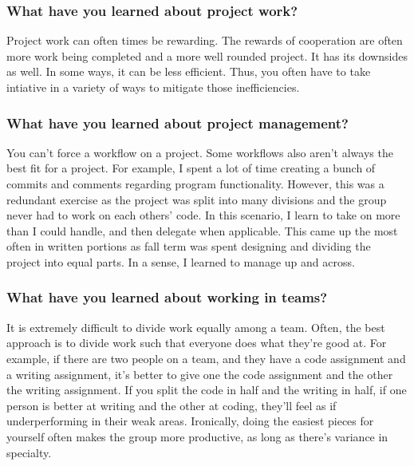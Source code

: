 \documentclass[10pt,journal,compsoc, draftclsnofoot,onecolumn]{IEEEtran}
\begin{document}
\subsubsection{What have you learned about project work?}
Project work can often times be rewarding.
The rewards of cooperation are often more work being completed and a more well rounded project.
It has its downsides as well.
In some ways, it can be less efficient.
Thus, you often have to take intiative in a variety of ways to mitigate those inefficiencies.

\subsubsection{What have you learned about project management?}
You can't force a workflow on a project.
Some workflows also aren't always the best fit for a project.
For example, I spent a lot of time creating a bunch of commits and comments regarding program functionality.
However, this was a redundant exercise as the project was split into many divisions and the group never had to work on each others' code.
In this scenario, I learn to take on more than I could handle, and then delegate when applicable.
This came up the most often in written portions as fall term was spent designing and dividing the project into equal parts.
In a sense, I learned to manage up and across.

\subsubsection{What have you learned about working in teams?}
It is extremely difficult to divide work equally among a team.
Often, the best approach is to divide work such that everyone does what they're good at.
For example, if there are two people on a team, and they have a code assignment and a writing assignment, it's better to give one the code assignment and the other the writing assignment.
If you split the code in half and the writing in half, if one person is better at writing and the other at coding, they'll feel as if underperforming in their weak areas.
Ironically, doing the easiest pieces for yourself often makes the group more productive, as long as there's variance in specialty.
\end{document}
